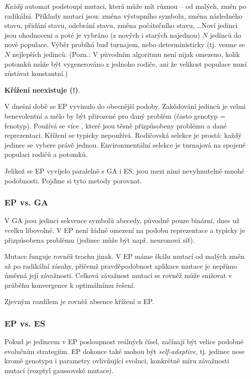 \textit{Každý} automat podstoupí mutaci, která může mít různou  -- od malých,  změn po radikální. Příklady mutací jsou: změna výstupního symbolu, změna následného stavu, přidání stavu, odebrání stavu, změna počátečního stavu, \dots Noví jedinci jsou ohodnoceni a poté je vybráno (z nových i starých najednou) $N$ jedinců do nové populace. Výběr probíhá buď turnajem, nebo deterministicky (tj. vezme se $N$ nejlepších jedinců. (Pozn.: V původním algoritmu není nijak omezeno, kolik potomků může být vygenerováno z jednoho rodiče, ani že velikost populace musí zůstávat konstantní.)

\textbf{Křížení neexistuje (!)}. 

V dnešní době se EP vyvinulo do obecnější podoby. Zakódování jedinců je velmi benevolentní a mělo by být přirozené pro daný problém (často genotyp = fenotyp). Používá se více , které jsou těsně přizpůsobeny problému a dané reprezentaci. Křížení se typicky nepoužívá. Rodičovská selekce je prostá: každý jedinec se vybere právě jednou. Environmentální selekce je turnajová na spojené populaci rodičů a potomků.

Jelikož se EP vyvíjelo paralelně s GA i ES, jsou mezi nimi nevyhnutelně mnohé podobnosti. Pojďme si tyto metody porovnat.

\subsubsection{EP vs. GA}
V GA jsou jedinci sekvence symbolů abecedy, původně pouze binární, dnes už vcelku libovolné. V EP není žádné omezení na podobu reprezentace a typicky je přizpůsobena problému (jedinec může být např. neuronová síť). 

Mutace funguje rovněž trochu jinak. V EP máme škálu mutací od malých změn až po radikální zásahy, přičemž pravděpodobnost aplikace mutace je nepřímo úměrná její závažnosti. Celková závažnost mutací se rovněž může snižovat v průběhu konvergence k optimálnímu řešení.

Zjevným rozdílem je rovněž absence křížení u EP.

\subsubsection{EP vs. ES}
Pokud je jedincem v EP posloupnost reálných čísel, začínají být velice podobné evolučním strategiím. EP dokonce také mohou být \textit{self-adaptive}, tj. jedinec nese kromě genotypu i parametry ovlivňující evoluci, konkrétně míru závažnosti mutací (rozptyl gaussovské mutace).

